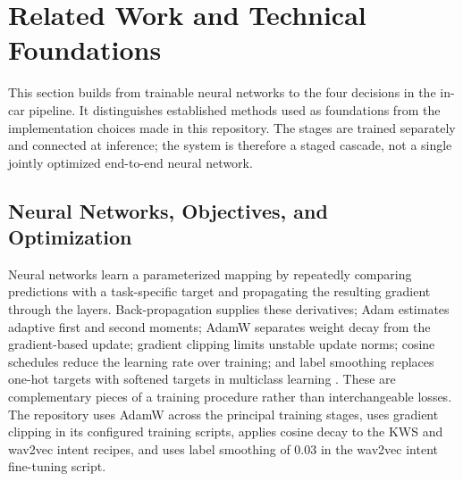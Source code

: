 
\section{Related Work and Technical Foundations}
\label{sec:related-work}

This section builds from trainable neural networks to the four decisions in the in-car pipeline. It distinguishes established methods used as foundations from the implementation choices made in this repository. The stages are trained separately and connected at inference; the system is therefore a staged cascade, not a single jointly optimized end-to-end neural network.

\subsection{Neural Networks, Objectives, and Optimization}
\label{subsec:nn-optimization}

Neural networks learn a parameterized mapping by repeatedly comparing predictions with a task-specific target and propagating the resulting gradient through the layers. Back-propagation supplies these derivatives; Adam estimates adaptive first and second moments; AdamW separates weight decay from the gradient-based update; gradient clipping limits unstable update norms; cosine schedules reduce the learning rate over training; and label smoothing replaces one-hot targets with softened targets in multiclass learning \cite{backprop1986,adam2015,adamw2019,sgdr2017,gradclip2013,labelsmooth2019}. These are complementary pieces of a training procedure rather than interchangeable losses. The repository uses AdamW across the principal training stages, uses gradient clipping in its configured training scripts, applies cosine decay to the KWS and wav2vec intent recipes, and uses label smoothing of 0.03 in the wav2vec intent fine-tuning script.

